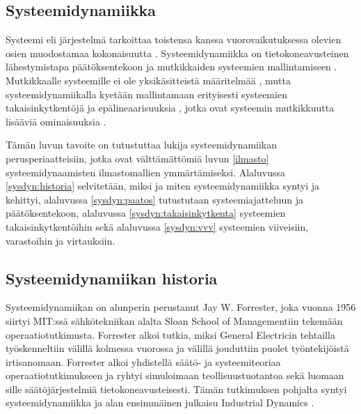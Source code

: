 \documentclass[finnish,12pt,a4paper,pdftex]{article}
\begin{document}
\begin{onehalfspacing}


\section{Systeemidynamiikka \label{sysdyn}}


Systeemi eli järjestelmä tarkoittaa toistensa kanssa vuorovaikutuksessa olevien osien muodostamaa kokonaisuutta \cite{Flood1988}. Systeemidynamiikka on tietokoneavusteinen lähestymistapa päätöksentekoon ja mutkikkaiden systeemien mallintamiseen \cite{WhatIsSystemDynamics}. Mutkikkaalle systeemille ei ole yksikäsitteistä määritelmää \cite{Zadeh1973}, mutta systeemidynamiikalla kyetään mallintamaan erityisesti systeemien takaisinkytkentöjä ja epälineaarisuuksia \cite{WhatIsSystemDynamics}, jotka ovat systeemin mutkikkuutta lisääviä ominaisuuksia \cite{Zadeh1973}. %

Tämän luvun tavoite on tutustuttaa lukija systeemidynamiikan perusperiaatteisiin, jotka ovat välttämättömiä luvun \ref{ilmasto} systeemidynaamisten ilmastomallien ymmärtämiseksi. Alaluvussa \ref{sysdyn:historia} selvitetään, miksi ja miten systeemidynamiikka syntyi ja kehittyi, alaluvussa \ref{sysdyn:paatos} tutustutaan systeemiajatteluun ja päätöksentekoon, alaluvussa \ref{sysdyn:takaisinkytkenta} systeemien takaisinkytkentöihin sekä alaluvussa \ref{sysdyn:vvv} systeemien viiveisiin, varastoihin ja virtauksiin. 

\subsection{Systeemidynamiikan historia \label{sysdyn:historia}} 


Systeemidynamiikan on alunperin perustanut Jay W. Forrester, joka vuonna 1956 siirtyi MIT:ssä sähkötekniikan alalta Sloan School of Managementiin tekemään operaatiotutkimusta. Forrester alkoi tutkia, miksi General Electricin tehtailla työskenneltiin välillä kolmessa vuorossa ja välillä jouduttiin puolet työntekijöistä irtisanomaan. Forrester alkoi yhdistellä säätö- ja systeemiteoriaa operaatiotutkimukseen ja ryhtyi simuloimaan teollisuustuotantoa sekä luomaan sille säätöjärjestelmiä tietokoneavusteisesti. Tämän tutkimuksen pohjalta syntyi systeemidynamiikka ja alan ensimmäinen julkaisu Industrial Dynamics \cite{Forrester1961}. \cite{Forrester1989} 


\end{onehalfspacing}
\end{document}
